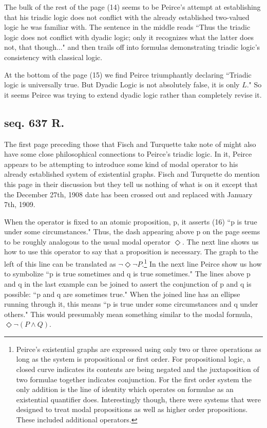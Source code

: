 \documentclass[12pt]{article}
\begin{document}
The bulk of the rest of the page (14) seems to be Peirce's attempt at establishing that his triadic logic does not conflict with the already established two-valued logic he was familiar with. The sentence in the middle reads ``Thus the triadic logic does not conflict with dyadic logic; only it recognizes what the latter does not, that though..." and then trails off into formulas demonstrating triadic logic's consistency with classical logic.

At the bottom of the page (15) we find Peirce triumphantly declaring ``Triadic logic is universally true. But Dyadic Logic is not absolutely false, it is only $L$." So it seems Peirce was trying to extend dyadic logic rather than completely revise it.

\subsection{seq. 637 R.}

The first page preceding those that Fisch and Turquette take note of might also have some close philosophical connections to Peirce's triadic logic. In it, Peirce appears to be attempting to introduce some kind of modal operator to his already established system of existential graphs. Fisch and Turquette do mention this page in their discussion but they tell us nothing of what is on it except that the December 27th, 1908 date has been crossed out and replaced with January 7th, 1909.

 When the operator is fixed to an atomic proposition, p, it asserts (16) ``p is true under some circumstances." Thus, the dash appearing above p on the page seems to be roughly analogous to the usual modal operator $\Diamond$. The next line shows us how to use this operator to say that a proposition is necessary. The graph to the left of this line can be translated as $\lnot \Diamond \lnot P$.\footnote{ Peirce's existential graphs are expressed using only two or three operations as long as the system is propositional or first order. For propositional logic, a closed curve indicates its contents are being negated and the juxtaposition of two formulae together indicates conjunction. For the first order system the only addition is the line of identity which operates on formulae as an existential quantifier does. Interestingly though, there were systems that were designed to treat modal propositions as well as higher order propositions. These included additional operators.} In the next line Peirce show us how to symbolize ``p is true sometimes and q is true sometimes." The lines above p and q in the last example can be joined to assert the conjunction of p and q is possible: ``p and q are sometimes true." When the joined line has an ellipse running through it, this means ``p is true under some circumstances and q under others." This would presumably mean something similar to the modal formula, $\Diamond \lnot (P \land Q)$.
 
\end{document}
